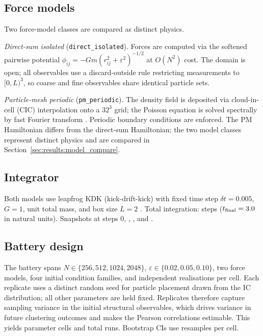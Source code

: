 \documentclass[11pt,a4paper]{article}
\newcommand{\heps}{\varepsilon}
\begin{document}
\subsection{Force models}

Two force-model classes are compared as distinct physics.

\textit{Direct-sum isolated} (\texttt{direct\_isolated}).
Forces are computed via the softened pairwise potential
$\phi_{ij} = -Gm(r_{ij}^2 + \heps^2)^{-1/2}$
at $O(N^2)$ cost.
The domain is open; all observables use a discard-outside rule restricting
measurements to $[0,L)^3$, so coarse and fine observables share identical
particle sets.

\textit{Particle-mesh periodic} (\texttt{pm\_periodic}).
The density field is deposited via cloud-in-cell (CIC) interpolation onto
a $32^3$ grid; the Poisson equation is solved spectrally by fast Fourier
transform \citep{HockneyEastwood1988}.
Periodic boundary conditions are enforced.
The PM Hamiltonian differs from the direct-sum Hamiltonian; the two model
classes represent distinct physics and are compared in
Section~\ref{sec:results:model_compare}.

\subsection{Integrator}

Both models use leapfrog KDK (kick-drift-kick) with fixed time step
$\delta t = 0.005$, $G = 1$, unit total mass, and box size $L = 2$
\citep{Quinn1997,Yoshida1990}.
Total integration: \NSteps{} steps ($t_{\rm final} = 3.0$ in natural units).
Snapshots at steps 0, \HEarly{}, \HMid{}, and \NSteps{}.

\subsection{Battery design}

The battery spans $N \in \{256, 512, 1024, 2048\}$,
$\heps \in \{0.02, 0.05, 0.10\}$, two force models, four initial
condition families, and \NReplicates{} independent realisations per cell.
Each replicate uses a distinct random seed for particle placement drawn
from the IC distribution; all other parameters are held fixed.
Replicates therefore capture sampling variance in the initial structural
observables, which drives variance in future clustering outcomes and
makes the Pearson correlations estimable.
This yields \NCells{} parameter cells and \TotalRuns{} total runs.
Bootstrap CIs use \NBootstrap{} resamples per cell.
\end{document}
